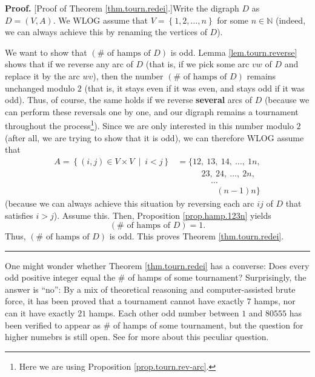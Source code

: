 \documentclass[numbers=enddot,12pt,final,onecolumn,notitlepage]{scrartcl}%
\numberwithin{exer}{subsection}
\theoremstyle{definition}
\newenvironment{proof}[1][Proof]{\noindent\textbf{#1.} }{\ \rule{0.5em}{0.5em}}
\begin{document}
\begin{proof}
[Proof of Theorem \ref{thm.tourn.redei}.]Write the digraph $D$ as $D=\left(
V,A\right)  $. We WLOG assume that $V=\left\{  1,2,\ldots,n\right\}  $ for
some $n\in\mathbb{N}$ (indeed, we can always achieve this by renaming the
vertices of $D$).

We want to show that $\left(  \#\text{ of hamps of }D\right)  $ is odd. Lemma
\ref{lem.tourn.reverse} shows that if we reverse any arc of $D$ (that is, if
we pick some arc $vw$ of $D$ and replace it by the arc $wv$), then the number
$\left(  \#\text{ of hamps of }D\right)  $ remains unchanged modulo $2$ (that
is, it stays even if it was even, and stays odd if it was odd). Thus, of
course, the same holds if we reverse \textbf{several} arcs of $D$ (because we
can perform these reversals one by one, and our digraph remains a tournament
throughout the process\footnote{Here we are using Proposition
\ref{prop.tourn.rev-arc}.}). Since we are only interested in this number
modulo $2$ (after all, we are trying to show that it is odd), we can therefore
WLOG assume that%
\begin{align*}
A=\left\{  \left(  i,j\right)  \in V\times V\ \mid\ i<j\right\}   &
=\{12,\ 13,\ 14,\ \ldots,\ 1n,\\
&  \ \ \ \ \ \ \ \ \ \ \ \ \ 23,\ 24,\ \ldots,\ 2n,\\
&  \ \ \ \ \ \ \ \ \ \ \ \ \ \ \ \ \ \ \ldots\\
&  \ \ \ \ \ \ \ \ \ \ \ \ \ \ \ \ \ \ \ \ \ \left(  n-1\right)  n\}
\end{align*}
(because we can always achieve this situation by reversing each arc $ij$ of
$D$ that satisfies $i>j$). Assume this. Then, Proposition \ref{prop.hamp.123n}
yields%
\[
\left(  \#\text{ of hamps of }D\right)  =1.
\]
Thus, $\left(  \#\text{ of hamps of }D\right)  $ is odd. This proves Theorem
\ref{thm.tourn.redei}.
\end{proof}

One might wonder whether Theorem \ref{thm.tourn.redei} has a converse: Does
every odd positive integer equal the $\#$ of hamps of some tournament?
Surprisingly, the answer is \textquotedblleft no\textquotedblright: By a mix
of theoretical reasoning and computer-assisted brute force, it has been proved
that a tournament cannot have exactly $7$ hamps, nor can it have exactly $21$
hamps. Each other odd number between $1$ and $80555$ has been verified to
appear as $\#$ of hamps of some tournament, but the question for higher
numebrs is still open. See \cite{MO232751} for more about this peculiar question.
\end{document}
